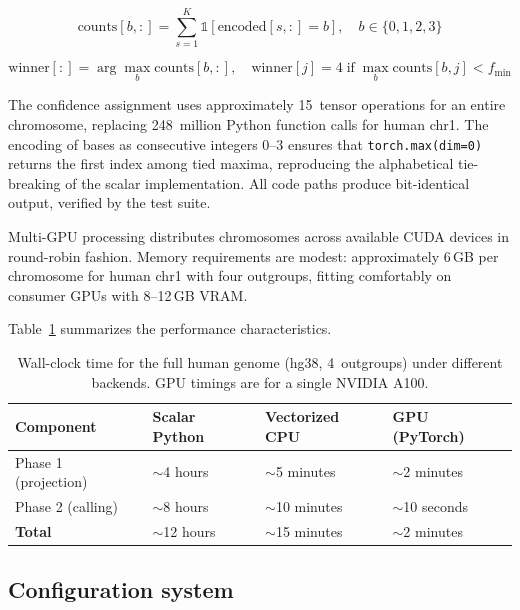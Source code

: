 \documentclass[11pt,a4paper]{article}
\begin{document}
\begin{equation}
\label{eq:gpu_vote}
\text{counts}[b, :] = \sum_{s=1}^{K} \mathbb{1}\left[\text{encoded}[s, :] = b\right], \quad b \in \{0,1,2,3\}
\end{equation}

\begin{equation}
\label{eq:gpu_winner}
\text{winner}[:] = \arg\max_{b} \text{counts}[b, :], \quad
\text{winner}[j] = 4 \;\text{if}\; \max_b \text{counts}[b, j] < f_\text{min}
\end{equation}

The confidence assignment uses approximately 15~tensor operations for an
entire chromosome, replacing 248~million Python function calls for human
chr1. The encoding of bases as consecutive integers 0--3 ensures that
\texttt{torch.max(dim=0)} returns the first index among tied maxima,
reproducing the alphabetical tie-breaking of the scalar implementation.
All code paths produce bit-identical output, verified by the test suite.

Multi-GPU processing distributes chromosomes across available CUDA devices
in round-robin fashion. Memory requirements are modest: approximately 6\,GB
per chromosome for human chr1 with four outgroups, fitting comfortably on
consumer GPUs with 8--12\,GB VRAM.

Table~\ref{tab:performance} summarizes the performance characteristics.

\begin{table}[t]
\centering
\caption{Wall-clock time for the full human genome (hg38, 4~outgroups) under
different backends. GPU timings are for a single NVIDIA A100.}
\label{tab:performance}
\begin{tabular}{@{}llll@{}}
\toprule
Component & Scalar Python & Vectorized CPU & GPU (PyTorch) \\
\midrule
Phase 1 (projection) & $\sim$4 hours & $\sim$5 minutes & $\sim$2 minutes \\
Phase 2 (calling) & $\sim$8 hours & $\sim$10 minutes & $\sim$10 seconds \\
\midrule
\textbf{Total} & $\sim$12 hours & $\sim$15 minutes & $\sim$2 minutes \\
\bottomrule
\end{tabular}
\end{table}

\subsection{Configuration system}
\label{sec:config}
\end{document}

